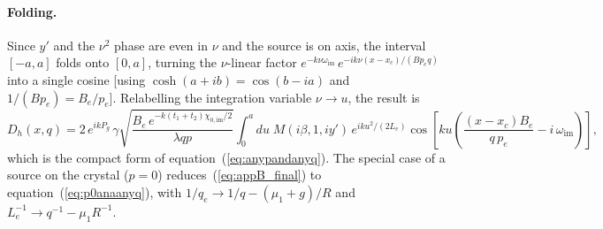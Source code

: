 \documentclass[preprint]{iucr}              %
\begin{document}
\paragraph*{Folding.}
Since $y'$ and the $\nu^2$ phase are even in $\nu$ and the source is on axis, the interval $[-a,a]$ folds onto $[0,a]$, turning the $\nu$-linear factor $e^{-k\nu\omega_\text{im}}\,e^{-ik\nu(x-x_c)/(Bp_eq)}$ into a single cosine [using $\cosh(a+ib)=\cos(b-ia)$ and $1/(Bp_e)=B_e/p_e$]. Relabelling the integration variable $\nu\to u$, the result is
\begin{equation}\label{eq:appB_final}
D_h(x,q)=2\,e^{ikP_g}\,\gamma\sqrt{\frac{B_e\,e^{-k(t_1+t_2)\chi_{0,\text{im}}/2}}{\lambda qp}}
\int_0^a\!du\;M(i\beta,1,iy')\,e^{iku^2/(2L_e)}
\cos\!\left[ku\!\left(\frac{(x-x_c)B_e}{q\,p_e}-i\,\omega_\text{im}\right)\right],
\end{equation}
which is the compact form of equation~(\ref{eq:anypandanyq}). The special case of a source on the crystal ($p=0$) reduces~(\ref{eq:appB_final}) to equation~(\ref{eq:p0anaanyq}), with $1/q_e\to1/q-(\mu_1+g)/R$ and $L_e^{-1}\to q^{-1}-\mu_1R^{-1}$.
\end{document}
